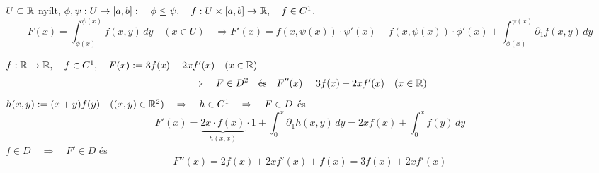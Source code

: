 \documentclass[a4paper,11.5pt]{article}
\begin{document}
	\begin{note}
		$U\subset\mathbb{R}$ nyílt, $\phi, \psi:U\to[a,b]:\quad \phi\leq\psi,\quad f:U\times[a,b]\to\mathbb{R},\quad f\in C^1$.
		\[ F(x)=\int_{\phi(x)}^{\psi(x)}f(x,y)\,dy\quad (x\in U)\quad \Rightarrow F'(x)=f(x,\psi(x))\cdot\psi'(x)-f(x,\psi(x))\cdot\phi'(x)+\int_{\phi(x)}^{\psi(x)}\partial_1f(x,y)\,dy \]
	\end{note}
	\begin{example}
		$f:\mathbb{R}\to\mathbb{R},\quad f\in C^1,\quad F(x):=3f(x)+2xf'(x)\quad (x\in\mathbb{R})$
		\[ \Rightarrow\quad F\in D^2\quad \text{és}\quad F''(x)=3f(x)+2xf'(x)\quad (x\in\mathbb{R}) \]
		$h(x,y):=(x+y)f(y)\quad ((x,y)\in\mathbb{R}^2)\quad \Rightarrow\quad h\in C^1\quad \Rightarrow\quad F\in D$ és
		\[ F'(x)=\underbrace{2x\cdot f(x)}_{h(x,x)}\cdot1+\int_0^x\partial_1h(x,y)\,dy=2xf(x)+\int_0^xf(y)\,dy \]
		$f\in D\quad \Rightarrow\quad F'\in D$ és 
		\[ F''(x)=2f(x)+2xf'(x)+f(x)=3f(x)+2xf'(x) \]   
	\end{example}
\end{document}
